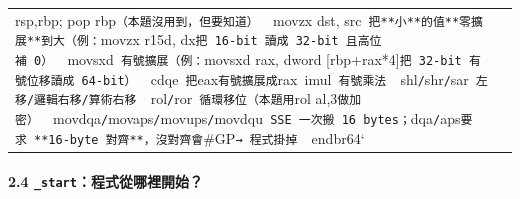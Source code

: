 \documentclass[10pt,a4paper]{article}
\begin{document}
{\begin{longtable}[]{@{}
  >{\raggedright\arraybackslash}p{}
  >{\raggedright\arraybackslash}p{}@{}}
rsp,rbp; pop
rbp\texttt{（本題沒用到，但要知道）\ \allowbreak{}\textbar{}\allowbreak{}\ \allowbreak{}\textbar{}\allowbreak{}}movzx dst,
src\texttt{\textbar{}\allowbreak{}\ \allowbreak{}把**小**的值**零擴展**到大（例：}movzx r15d,
dx\texttt{把\ \allowbreak{}16-\allowbreak{}bit\ \allowbreak{}讀成\ \allowbreak{}32-\allowbreak{}bit\ \allowbreak{}且高位補\ \allowbreak{}0）\ \allowbreak{}\textbar{}\allowbreak{}\ \allowbreak{}\textbar{}\allowbreak{}}movsxd\texttt{\textbar{}\allowbreak{}\ \allowbreak{}有號擴展（例：}movsxd
rax, dword
{[}rbp+rax*4{]}\texttt{把\ \allowbreak{}32-\allowbreak{}bit\ \allowbreak{}有號位移讀成\ \allowbreak{}64-\allowbreak{}bit）\ \allowbreak{}\textbar{}\allowbreak{}\ \allowbreak{}\textbar{}\allowbreak{}}cdqe\texttt{\textbar{}\allowbreak{}\ \allowbreak{}把}eax\texttt{有號擴展成}rax\texttt{\textbar{}\allowbreak{}\ \allowbreak{}\textbar{}\allowbreak{}}imul\texttt{\textbar{}\allowbreak{}\ \allowbreak{}有號乘法\ \allowbreak{}\textbar{}\allowbreak{}\ \allowbreak{}\textbar{}\allowbreak{}}shl\texttt{/}shr\texttt{/}sar\texttt{\textbar{}\allowbreak{}\ \allowbreak{}左移/\allowbreak{}邏輯右移/\allowbreak{}算術右移\ \allowbreak{}\textbar{}\allowbreak{}\ \allowbreak{}\textbar{}\allowbreak{}}rol\texttt{/}ror\texttt{\textbar{}\allowbreak{}\ \allowbreak{}循環移位（本題用}rol
al,3\texttt{做加密）\ \allowbreak{}\textbar{}\allowbreak{}\ \allowbreak{}\textbar{}\allowbreak{}}movdqa\texttt{/}movaps\texttt{/}movups\texttt{/}movdqu\texttt{\textbar{}\allowbreak{}\ \allowbreak{}SSE\ \allowbreak{}一次搬\ \allowbreak{}16\ \allowbreak{}bytes；}dqa\texttt{/}aps\texttt{要求\ \allowbreak{}**16-\allowbreak{}byte\ \allowbreak{}對齊**，沒對齊會}\#GP\texttt{→\ \allowbreak{}程式掛掉\ \allowbreak{}\textbar{}\allowbreak{}\ \allowbreak{}\textbar{}\allowbreak{}}endbr64` \\
\end{longtable}
}

\paragraph{\texorpdfstring{2.4
\texttt{\_\allowbreak{}start}：程式從哪裡開始？}{2.4 \_start：程式從哪裡開始？}}\label{startux7a0bux5f0fux5f9eux54eaux88e1ux958bux59cb}
\end{document}
